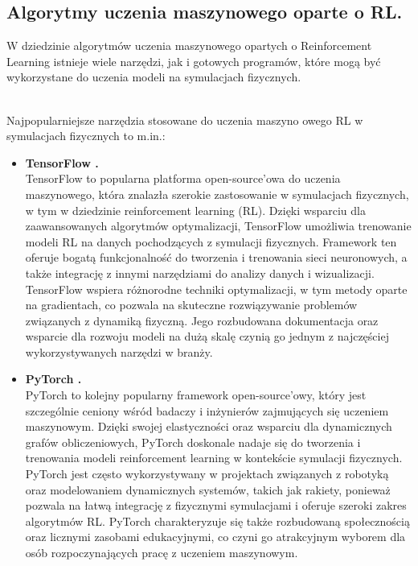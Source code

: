\subsection{Algorytmy uczenia maszynowego oparte o RL.}

W dziedzinie algorytmów uczenia maszynowego opartych o Reinforcement
Learning istnieje wiele narzędzi, jak i gotowych programów, które mogą być
wykorzystane do
uczenia modeli na symulacjach fizycznych.

\\

Najpopularniejsze narzędzia stosowane do uczenia maszyno owego RL w
symulacjach fizycznych to m.in.:


\begin{itemize}
    \item \textbf{TensorFlow \cite{DBLP:journals/corr/AbadiBCCDDDGIIK16}.} \\
    TensorFlow to popularna platforma open-source'owa do uczenia maszynowego, która znalazła szerokie zastosowanie w symulacjach fizycznych, w tym w dziedzinie reinforcement learning (RL). Dzięki wsparciu dla zaawansowanych algorytmów optymalizacji, TensorFlow umożliwia trenowanie modeli RL na danych pochodzących z symulacji fizycznych. Framework ten oferuje bogatą funkcjonalność do tworzenia i trenowania sieci neuronowych, a także integrację z innymi narzędziami do analizy danych i wizualizacji. TensorFlow wspiera różnorodne techniki optymalizacji, w tym metody oparte na gradientach, co pozwala na skuteczne rozwiązywanie problemów związanych z dynamiką fizyczną. Jego rozbudowana dokumentacja oraz wsparcie dla rozwoju modeli na dużą skalę czynią go jednym z najczęściej wykorzystywanych narzędzi w branży.

    \item \textbf{PyTorch \cite{DBLP:journals/corr/abs-1912-01703}.} \\
    PyTorch to kolejny popularny framework open-source'owy, który jest
    szczególnie ceniony wśród badaczy i inżynierów zajmujących się uczeniem maszynowym. Dzięki swojej elastyczności oraz wsparciu dla dynamicznych grafów obliczeniowych, PyTorch doskonale nadaje się do tworzenia i trenowania modeli reinforcement learning w kontekście symulacji fizycznych. PyTorch jest często wykorzystywany w projektach związanych z robotyką oraz modelowaniem dynamicznych systemów, takich jak rakiety, ponieważ pozwala na łatwą integrację z fizycznymi symulacjami i oferuje szeroki zakres algorytmów RL. PyTorch charakteryzuje się także rozbudowaną społecznością oraz licznymi zasobami edukacyjnymi, co czyni go atrakcyjnym wyborem dla osób rozpoczynających pracę z uczeniem maszynowym.


\end{itemize}
